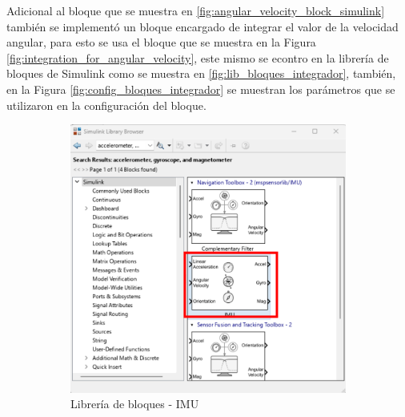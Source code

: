 Adicional al bloque que se muestra en \ref{fig:angular_velocity_block_simulink} también se implementó un bloque encargado de integrar el valor de la velocidad angular, para esto se usa el bloque que se muestra en la Figura \ref{fig:integration_for_angular_velocity}, este mismo se econtro en la librería de bloques de Simulink como se muestra en \ref{fig:lib_bloques_integrador}, también, en la Figura \ref{fig:config_bloques_integrador} se muestran los parámetros que se utilizaron en la configuración del bloque.
\newpage

\begin{figure}[htbp]
    \centering
    \begin{subfigure}[b]{0.35\textwidth}
        \centering
        \includegraphics[width=\textwidth]{fig/Capitulo5/Caso_de_estudio_IMU/Generador_de_archivos/libreria_de_bloques_IMU.pdf}
        \caption{Librería de bloques - IMU}
        \label{fig:lib_bloques_IMU}
    \end{subfigure}
    \hfill
    \begin{subfigure}[b]{0.35\textwidth}
        \centering

\end{subfigure}
\end{figure}
